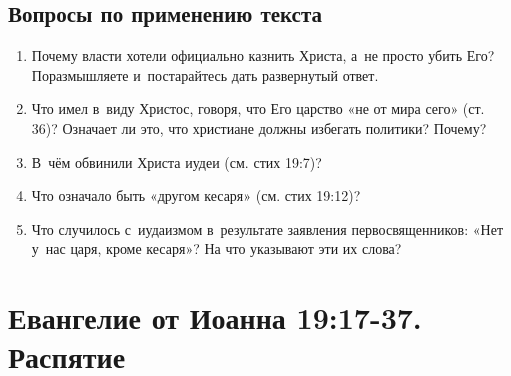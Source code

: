 \documentclass[a4paper,12pt]{article}
\begin{document}
\subsection*{Вопросы по применению текста} 
\begin{enumerate}
    \item Почему власти хотели официально казнить Христа, а~не просто убить Его? Поразмышляете и~постарайтесь дать развернутый ответ. 
    
    \myline
    
    \myline
    \item Что имел в~виду Христос, говоря, что Его царство «не от мира сего» (ст. 36)? Означает ли это, что христиане должны избегать политики? Почему? 
    
    \myline
    
    \myline
    \item В~чём обвинили Христа иудеи (см. стих 19:7)?
    
    \myline
    
    \myline
    \item Что означало быть «другом кесаря» (см. стих 19:12)? 
    
    \myline
    
    \myline
    \item Что случилось с~иудаизмом в~результате заявления первосвященников: «Нет у~нас царя, кроме кесаря»? На что указывают эти их слова? 
    
    \myline
    
    \myline
\end{enumerate}



\section{Евангелие от Иоанна 19:17-37. Распятие}
\end{document}
